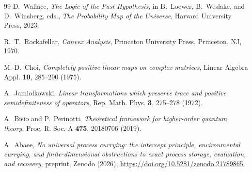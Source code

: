\documentclass[11pt,a4paper]{article}
\theoremstyle{definition}
\theoremstyle{plain}
\theoremstyle{remark}
\begin{document}
\begin{thebibliography}{99}
D.~Wallace,
\emph{The Logic of the Past Hypothesis}, in B.~Loewer, B.~Weslake, and D.~Winsberg, eds.,
\emph{The Probability Map of the Universe}, Harvard University Press, 2023.

R.~T.~Rockafellar,
\emph{Convex Analysis},
Princeton University Press, Princeton, NJ, 1970.

M.-D.~Choi,
\emph{Completely positive linear maps on complex matrices},
Linear Algebra Appl. \textbf{10}, 285--290 (1975).

A.~Jamio\l{}kowski,
\emph{Linear transformations which preserve trace and positive semidefiniteness of operators},
Rep. Math. Phys. \textbf{3}, 275--278 (1972).

A.~Bisio and P.~Perinotti,
\emph{Theoretical framework for higher-order quantum theory},
Proc. R. Soc. A \textbf{475}, 20180706 (2019).

A.~Abaee,
\emph{No universal process currying: the intercept principle, environmental
currying, and finite-dimensional obstructions to exact process storage,
evaluation, and recovery},
preprint, Zenodo (2026),
\url{https://doi.org/10.5281/zenodo.21789865}.

\end{thebibliography}
\end{document}
